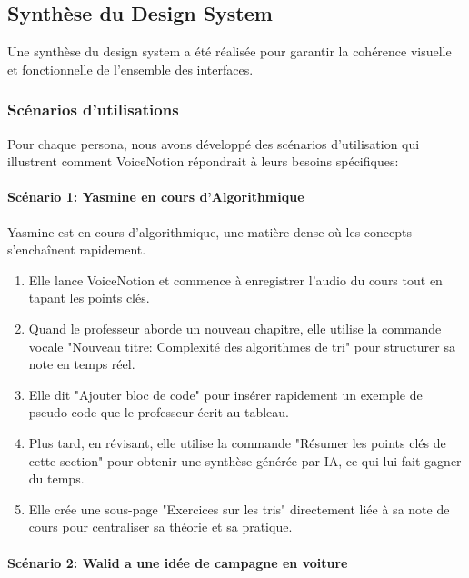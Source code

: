     \subsection{Synthèse du Design System}
    
    Une synthèse du design system a été réalisée pour garantir la cohérence visuelle et fonctionnelle de l'ensemble des interfaces.
    
        
    \subsubsection{Scénarios d'utilisations}
    
    Pour chaque persona, nous avons développé des scénarios d'utilisation qui illustrent comment VoiceNotion répondrait à leurs besoins spécifiques:
    
    
    
    \paragraph{Scénario 1: Yasmine en cours d'Algorithmique}
    
    Yasmine est en cours d'algorithmique, une matière dense où les concepts s'enchaînent rapidement.
    \begin{enumerate}
        \item Elle lance VoiceNotion et commence à enregistrer l'audio du cours tout en tapant les points clés.
        \item Quand le professeur aborde un nouveau chapitre, elle utilise la commande vocale "Nouveau titre: Complexité des algorithmes de tri" pour structurer sa note en temps réel.
        \item Elle dit "Ajouter bloc de code" pour insérer rapidement un exemple de pseudo-code que le professeur écrit au tableau.
        \item Plus tard, en révisant, elle utilise la commande "Résumer les points clés de cette section" pour obtenir une synthèse générée par IA, ce qui lui fait gagner du temps.
        \item Elle crée une sous-page "Exercices sur les tris" directement liée à sa note de cours pour centraliser sa théorie et sa pratique.
    \end{enumerate}
    
    \paragraph{Scénario 2: Walid a une idée de campagne en voiture}
    
